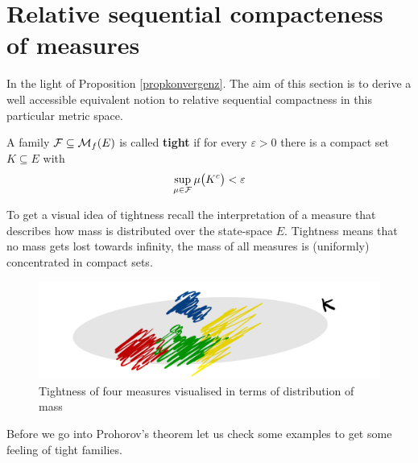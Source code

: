 	\marginpar{\textcolor{red}{Lecture 13}}

\section[Relative sequential compacteness of measures]{Relative sequential compacteness of measures}\label{sec:tight}




In the light of Proposition \ref{propkonvergenz}. The aim of this section is to derive a well accessible equivalent notion to relative sequential compactness in this particular metric space. 

\begin{ldef}
\begin{deff}\label{def_tight}
	A family $\mathcal{F} \subseteq \mathcal{M}_f(E)$ is called \textbf{tight}  if for every $\varepsilon>0$ there is a compact set $K \subseteq E$ with $$ \sup_{\mu \in \mathcal{F}} \mu \big(K^c\big) < \varepsilon$$
\end{deff}
\end{ldef}
To get a visual idea of tightness recall the interpretation of a measure that describes how mass is distributed over the state-space $E$. Tightness means that no mass gets lost towards infinity, the mass of all measures is (uniformly) concentrated in compact sets. 
\begin{figure}[h]
			\begin{center}
				\includegraphics[scale=0.07]{tight.jpeg}
			\end{center}
			\vspace{-7mm}
			\caption*{Tightness of four measures visualised in terms of distribution of mass}
			\end{figure}
			Before we go into Prohorov's theorem let us check some examples to get some feeling of tight families.

